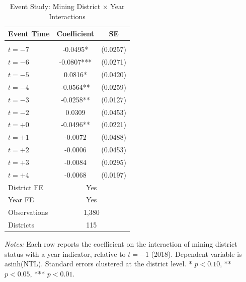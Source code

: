 \begin{table}[htbp]
\centering
\caption{Event Study: Mining District $\times$ Year Interactions}
\label{tab:event}
\begin{tabular}{lcc}
\hline\hline
Event Time & Coefficient & SE \\
\hline
\addlinespace
\multicolumn{3}{l}{\textit{Pre-reform}} \\
\addlinespace
$t=-7$ & -0.0495* & (0.0257) \\
$t=-6$ & -0.0807*** & (0.0271) \\
$t=-5$ & 0.0816* & (0.0420) \\
$t=-4$ & -0.0564** & (0.0259) \\
$t=-3$ & -0.0258** & (0.0127) \\
$t=-2$ & 0.0309 & (0.0453) \\
$t=+0$ & -0.0496** & (0.0221) \\
$t=+1$ & -0.0072 & (0.0488) \\
$t=+2$ & -0.0006 & (0.0453) \\
$t=+3$ & -0.0084 & (0.0295) \\
$t=+4$ & -0.0068 & (0.0197) \\
\addlinespace
District FE & \multicolumn{2}{c}{Yes} \\
Year FE & \multicolumn{2}{c}{Yes} \\
Observations & \multicolumn{2}{c}{1,380} \\
Districts & \multicolumn{2}{c}{115} \\
\hline\hline
\end{tabular}
\begin{tablenotes}
\item \textit{Notes:} Each row reports the coefficient on the interaction of mining district status with a year indicator, relative to $t=-1$ (2018). Dependent variable is asinh(NTL). Standard errors clustered at the district level. * $p<0.10$, ** $p<0.05$, *** $p<0.01$.
\end{tablenotes}
\end{table}

